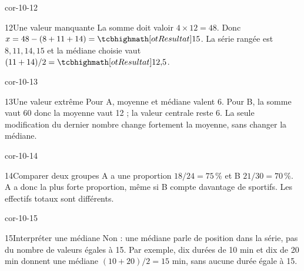 \begin{blocLivre}{cor-10-12}\begin{corrige}{12}{Une valeur manquante}
La somme doit valoir $4\times12=48$. Donc $x=48-(8+11+14)=\res{15}$. La série rangée est $8,11,14,15$ et la médiane choisie vaut $(11+14)/2=\res{12{,}5}$.
\end{corrige}\end{blocLivre}
\begin{blocLivre}{cor-10-13}\begin{corrige}{13}{Une valeur extrême}
Pour A, moyenne et médiane valent 6. Pour B, la somme vaut 60 donc la moyenne vaut 12 ; la valeur centrale reste 6. La seule modification du dernier nombre change fortement la moyenne, sans changer la médiane.
\end{corrige}\end{blocLivre}
\begin{blocLivre}{cor-10-14}\begin{corrige}{14}{Comparer deux groupes}
A a une proportion $18/24=75\,\%$ et B $21/30=70\,\%$. A a donc la plus forte proportion, même si B compte davantage de sportifs. Les effectifs totaux sont différents.
\end{corrige}\end{blocLivre}
\begin{blocLivre}{cor-10-15}\begin{corrige}{15}{Interpréter une médiane}
Non : une médiane parle de position dans la série, pas du nombre de valeurs égales à 15. Par exemple, dix durées de 10 min et dix de 20 min donnent une médiane $(10+20)/2=15$ min, sans aucune durée égale à 15.
\end{corrige}\end{blocLivre}
